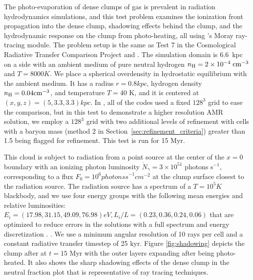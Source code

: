 The photo-evaporation of dense clumps of gas is prevalent in radiation
hydrodynamics simulations, and this test problem examines the
ionization front propagation into the dense clump, shadowing effects
behind the clump, and the hydrodynamic response on the clump from
photo-heating, all using \enzo's Moray ray-tracing module.  The
problem setup is the same as Test 7 in the Cosmological Radiative
Transfer Comparison Project \citep{IlievEtAl2009} and
\citet{Wise11_Moray}.  The simulation domain is 6.6~kpc on a side with
an ambient medium of pure neutral hydrogen $n_{\rm H} = 2 \times
10^{-4}\; \cubecm$ and $T = 8000 \unit{K}$.  We place a spherical
overdensity in hydrostatic equilibrium with the ambient medium.  It
has a radius $r = 0.8 \unit{kpc}$, hydrogen density $n_{\rm H} = 0.04
\cubecm$, and temperature $T = 40$ K, and it is centered at $(x,y,z) =
(5, 3.3, 3.3) \unit{kpc}$.  In \citet{IlievEtAl2009}, all of the codes
used a fixed $128^3$ grid to ease the comparison, but in this test to
demonstrate a higher resolution AMR solution, we employ a $128^3$ grid
with two additional levels of refinement with cells with a baryon mass
(method 2 in Section~\ref{sec:refinement_criteria}) greater than 1.5
being flagged for refinement.  This test is run for 15 Myr.

This cloud is subject to radiation from a point source at the center
of the $x=0$ boundary with an ionizing photon luminosity
$\dot{N}_\gamma = 3 \times 10^{51}$ photons s$^{-1}$, corresponding to
a flux $F_0 = 10^6 \unit{photons s}^{-1} \unit{cm}^{-2}$ at the clump
surface closest to the radiation source.  The radiation source has a
spectrum of a $T = 10^5 \unit{K}$ blackbody, and we use four energy
groups with the following mean energies and relative luminosities:
$E_i = (17.98, 31.15, 49.09, 76.98) \unit{eV}, L_i/L = (0.23, 0.36,
0.24, 0.06)$ that are optimized to reduce errors in the solutions with
a full spectrum and energy discretization \citep{Mirocha12}.
\citep[Note that this choice of energy groups is different
from][]{Wise11_Moray}.  We use a minimum angular resolution of 10 rays
per cell and a constant radiative transfer timestep of 25 kyr.  Figure
\ref{fig:shadowing} depicts the clump after at $t = 15$ Myr with the
outer layers expanding after being photo-heated.  It also shows the
sharp shadowing effects of the dense clump in the neutral fraction
plot that is representative of ray tracing techniques.

